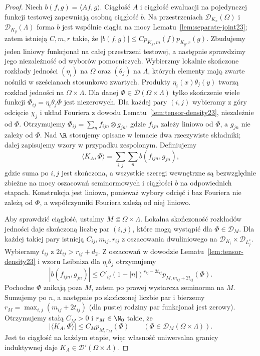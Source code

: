 \begin{proof}
Niech $b(f,g)=\langle Af,g\rangle$. Ciągłość $A$
i ciągłość ewaluacji na pojedynczej funkcji testowej
zapewniają osobną ciągłość $b$. Na przestrzeniach
$\mathcal D_{K_x}(\Omega)$ i $\mathcal D_{K_y}(\Lambda)$
forma $b$ jest wspólnie ciągła na mocy
Lematu~\ref{lem:separate-joint23}; zatem istnieją
$C,m,r$ takie, że
$|b(f,g)|\le C p_{K_x,m}(f)p_{K_y,r}(g)$.
Zbudujemy jeden liniowy funkcjonał na całej przestrzeni
testowej, a następnie sprawdzimy jego niezależność
od wyborów pomocniczych. Wybierzmy lokalnie skończone
rozkłady jedności $(\eta_i)$ na $\Omega$ oraz
$(\theta_j)$ na $\Lambda$, których elementy mają zwarte
nośniki w sześcianach stosunkowo zwartych. Produkty
$\eta_i(x)\theta_j(y)$ tworzą rozkład jedności na
$\Omega\times\Lambda$. Dla danej
$\Phi\in\mathcal D(\Omega\times\Lambda)$ tylko skończenie
wiele funkcji $\Phi_{ij}=\eta_i\theta_j\Phi$ jest niezerowych.
Dla każdej pary $(i,j)$ wybieramy z góry odcięcie
$\chi_j$ i układ Fouriera z dowodu
Lematu~\ref{lem:tensor-density23}, niezależnie od $\Phi$.
Otrzymujemy $\Phi_{ij}=\sum_n f_{ijn}\otimes g_{jn}$,
gdzie $f_{ijn}$ zależy liniowo od $\Phi$,
a $g_{jn}$ nie zależy od $\Phi$.
Nad $\R$ stosujemy opisane w lemacie dwa rzeczywiste
składniki; dalej zapisujemy wzory w przypadku zespolonym.
Definiujemy
\[
 \langle K_A,\Phi\rangle=\sum_{i,j}\sum_n b(f_{ijn},g_{jn}),
\]
gdzie suma po $i,j$ jest skończona, a wszystkie szeregi
wewnętrzne są bezwzględnie zbieżne na mocy oszacowań
seminormowych i ciągłości $b$ na odpowiednich etapach.
Konstrukcja jest liniowa, ponieważ wybory odcięć i baz
Fouriera nie zależą od $\Phi$, a współczynniki Fouriera
zależą od niej liniowo.

Aby sprawdzić ciągłość, ustalmy $M\Subset\Omega\times\Lambda$.
Lokalna skończoność rozkładów jedności daje skończoną
liczbę par $(i,j)$, które mogą wystąpić dla
$\Phi\in\mathcal D_M$. Dla każdej takiej pary istnieją $C_{ij},m_{ij},r_{ij}$
z oszacowania dwuliniowego na $\mathcal D_{K_i}
\times\mathcal D_{L_j^*}$. Wybieramy $t_{ij}$ z
$2t_{ij}>r_{ij}+d_2$. Z oszacowań w dowodzie
Lematu~\ref{lem:tensor-density23} i wzoru Leibniza
dla $\eta_i\theta_j$ otrzymujemy
\[
 |b(f_{ijn},g_{jn})|\le C'_{ij}
 (1+|n|)^{r_{ij}-2t_{ij}}
 p_{M,m_{ij}+2t_{ij}}(\Phi).
\]
Pochodne $\Phi$ znikają poza $M$, zatem po prawej
wystarcza seminorma na $M$. Sumujemy po $n$,
a następnie po skończonej liczbie par i bierzemy
$r_M=\max_{i,j}(m_{ij}+2t_{ij})$ (dla pustej
rodziny par funkcjonał jest zerowy). Otrzymujemy
stałą $C_M>0$ i $r_M\in\N_0$ takie, że
\[
 |\langle K_A,\Phi\rangle|\le C_M p_{M,r_M}(\Phi)
 \qquad (\Phi\in\mathcal D_M(\Omega\times\Lambda)).
\]
Jest to ciągłość na każdym etapie, więc własność
uniwersalna granicy induktywnej daje
$K_A\in\mathcal D'(\Omega\times\Lambda)$.


\end{proof}
